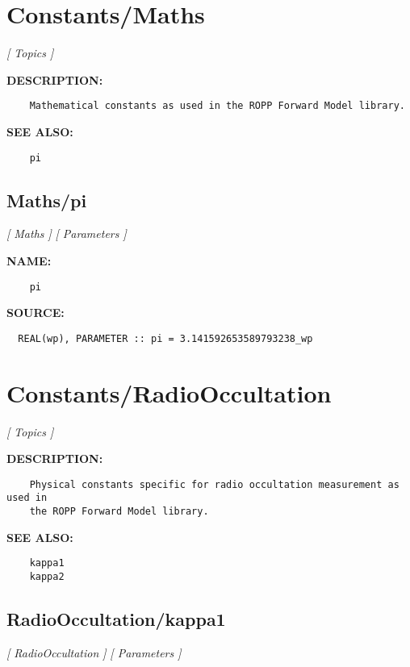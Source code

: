 \section{Constants/Maths}
\textsl{[ Topics ]}

\label{ch:robo6}
\label{ch:Constants_Maths}
\textbf{DESCRIPTION:}\hspace{0.08in}\begin{Verbatim}
    Mathematical constants as used in the ROPP Forward Model library. 
\end{Verbatim}
\textbf{SEE ALSO:}\hspace{0.08in}\begin{Verbatim}
    pi
\end{Verbatim}
\subsection{Maths/pi}
\textsl{[ Maths ]}
\textsl{[ Parameters ]}

\label{ch:robo32}
\label{ch:Maths_pi}
\textbf{NAME:}\hspace{0.08in}\begin{Verbatim}
    pi  
\end{Verbatim}
\textbf{SOURCE:}\hspace{0.08in}\begin{Verbatim}
  REAL(wp), PARAMETER :: pi = 3.141592653589793238_wp   
\end{Verbatim}
\section{Constants/RadioOccultation}
\textsl{[ Topics ]}

\label{ch:robo7}
\label{ch:Constants_RadioOccultation}
\textbf{DESCRIPTION:}\hspace{0.08in}\begin{Verbatim}
    Physical constants specific for radio occultation measurement as used in
    the ROPP Forward Model library.
\end{Verbatim}
\textbf{SEE ALSO:}\hspace{0.08in}\begin{Verbatim}
    kappa1
    kappa2
\end{Verbatim}
\subsection{RadioOccultation/kappa1}
\textsl{[ RadioOccultation ]}
\textsl{[ Parameters ]}

